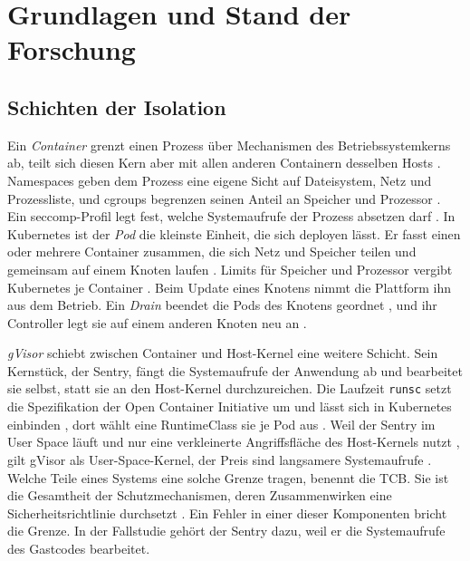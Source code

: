 \clearpage
\section{Grundlagen und Stand der Forschung} \label{sec:grundlagen}

\subsection{Schichten der Isolation}
\label{sec:grundlagen:isolation}

Ein \emph{Container} grenzt einen Prozess über Mechanismen des Betriebssystemkerns ab, teilt sich
diesen Kern aber mit allen anderen Containern desselben Hosts
\autocite[S.~18]{souppaya_application_2017}. Namespaces geben dem Prozess eine eigene Sicht auf Dateisystem, Netz und
Prozessliste, und cgroups begrenzen seinen Anteil an Speicher und Prozessor
\autocite[S.~6--7]{souppaya_application_2017}. Ein seccomp-Profil legt fest, welche Systemaufrufe der Prozess absetzen
darf \autocite[S.~25]{souppaya_application_2017}. In Kubernetes ist der \emph{Pod} die kleinste Einheit, die sich
deployen lässt. Er fasst einen oder mehrere Container zusammen, die sich Netz und Speicher teilen und gemeinsam auf
einem Knoten laufen \autocite{the_kubernetes_authors_pods_2026}. Limits für Speicher und Prozessor vergibt
Kubernetes je Container \autocite{the_kubernetes_authors_resource_2026}. Beim Update eines Knotens nimmt die Plattform
ihn aus dem Betrieb. Ein \emph{Drain} beendet die Pods des Knotens geordnet \autocite{the_kubernetes_authors_safely_2026}, und ihr Controller legt sie auf einem anderen Knoten neu an \autocite{the_kubernetes_authors_pods_2026}.

\emph{gVisor} schiebt zwischen Container und Host-Kernel eine weitere Schicht. Sein Kernstück, der Sentry, fängt die
Systemaufrufe der Anwendung ab und bearbeitet sie selbst, statt sie an den Host-Kernel durchzureichen. Die Laufzeit
\texttt{runsc} setzt die Spezifikation der Open Container Initiative um und lässt sich in Kubernetes einbinden \autocite{the_gvisor_authors_what_2026}, dort wählt eine RuntimeClass sie je Pod aus \autocite{the_kubernetes_authors_runtime_2026}. Weil der Sentry im User Space läuft und nur eine
verkleinerte Angriffsfläche des Host-Kernels nutzt \autocites{the_gvisor_authors_what_2026}{the_gvisor_authors_security_2026}, gilt gVisor als
User-Space-Kernel, der Preis sind langsamere Systemaufrufe \autocite[S.~3]{young_true_2019}. Welche Teile eines
Systems eine solche Grenze tragen, benennt die \ac{TCB}. Sie ist die Gesamtheit der Schutzmechanismen, deren
Zusammenwirken eine Sicherheitsrichtlinie durchsetzt \autocite[S.~112]{dod_trusted_1985}. Ein Fehler in einer dieser
Komponenten bricht die Grenze. In der Fallstudie gehört der Sentry dazu, weil er die Systemaufrufe des Gastcodes
bearbeitet.

